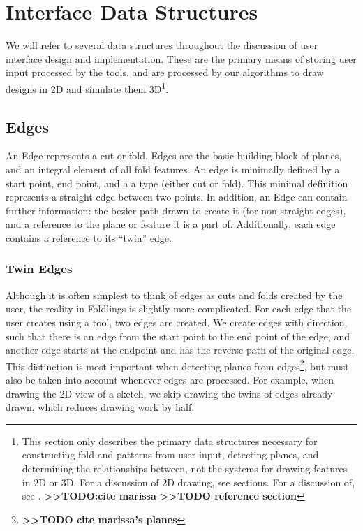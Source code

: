 \section{Interface Data Structures}\label{interface-data-structures}

We will refer to several data structures throughout the discussion of
user interface design and implementation. These are the primary means of
storing user input processed by the tools, and are processed by our
algorithms to draw designs in 2D and simulate them 3D\footnote{This
  section only describes the primary data structures necessary for
  constructing fold and patterns from user input, detecting planes, and
  determining the relationships between, not the systems for drawing
  features in 2D or 3D. For a discussion of 2D drawing, see sections.
  For a discussion of, see .
  \textbf{\textgreater{}\textgreater{}TODO:cite marissa
  \textgreater{}\textgreater{}TODO reference section}}.

\subsection{Edges}\label{edges}

An Edge represents a cut or fold. Edges are the basic building block of
planes, and an integral element of all fold features. An edge is
minimally defined by a start point, end point, and a a type (either cut
or fold). This minimal definition represents a straight edge between two
points. In addition, an Edge can contain further information: the bezier
path drawn to create it (for non-straight edges), and a reference to the
plane or feature it is a part of. Additionally, each edge contains a
reference to its ``twin'' edge.

\subsubsection{Twin Edges}\label{twin-edges}

Although it is often simplest to think of edges as cuts and folds
created by the user, the reality in Foldlings is slightly more
complicated. For each edge that the user creates using a tool, two edges
are created. We create edges with direction, such that there is an edge
from the start point to the end point of the edge, and another edge
starts at the endpoint and has the reverse path of the original edge.
This distinction is most important when detecting planes from
edges\footnote{\textbf{\textgreater{}\textgreater{}TODO cite marissa's
  planes}}, but must also be taken into account whenever edges are
processed. For example, when drawing the 2D view of a sketch, we skip
drawing the twins of edges already drawn, which reduces drawing work by
half.

